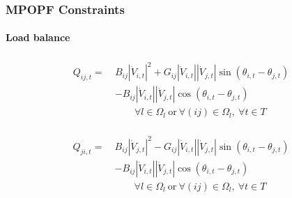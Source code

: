 \documentclass[
	11pt, %
	aspectratio=169, %
]{beamer}
\begin{document}


\begin{frame}
	\frametitle{MPOPF Constraints}
	\framesubtitle{Load balance} %

	\begin{align}
	\label{eq:Mexpr_q_flow_ij}
		\begin{split}
			Q_{ij,t} =\ &B_{ij}\left\lvert \dot{V}_{i,t}\right\rvert^{2} + G_{ij}\left\lvert \dot{V}_{i,t}\right\rvert\left\lvert \dot{V}_{j,t}\right\rvert \sin{\left(\theta_{i,t}-\theta_{j,t}\right)} \\
			&- B_{ij}\left\lvert \dot{V}_{i,t}\right\rvert\left\lvert \dot{V}_{j,t}\right\rvert \cos{\left(\theta_{i,t}-\theta_{j,t}\right)} \\[1em]
			&\qquad \forall l \in \Omega_{l} \ \text{or} \ \forall (ij) \in \Omega_{l},\ \forall t \in T
		\end{split}
	\end{align}

	\begin{align}
	\label{eq:Mexpr_q_flow_ji}
		\begin{split}
			Q_{ji,t} =\ &B_{ij}\left\lvert \dot{V}_{j,t}\right\rvert^{2} - G_{ij}\left\lvert \dot{V}_{i,t}\right\rvert\left\lvert \dot{V}_{j,t}\right\rvert \sin{\left(\theta_{i,t}-\theta_{j,t}\right)} \\
			&- B_{ij}\left\lvert \dot{V}_{i,t}\right\rvert\left\lvert \dot{V}_{j,t}\right\rvert \cos{\left(\theta_{i,t}-\theta_{j,t}\right)} \\[1em]
			&\qquad \forall l \in \Omega_{l} \ \text{or} \ \forall (ij) \in \Omega_{l},\ \forall t \in T
		\end{split}
\end{align}

\end{frame}

\end{document}

